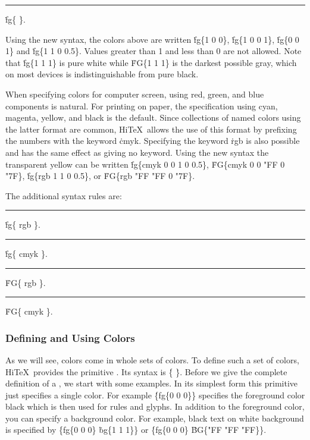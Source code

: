 \medskip
{}
\rule{}:
\.{fg\{}     \.{\}}.
\medskip

Using the new syntax, the colors above are written
\.{fg\{1 0 0\}}, \.{fg\{1 0 0 1\}},
\.{fg\{0 0 1\}} and \.{fg\{1 1 0 0.5\}}.
Values greater than 1 and less than 0 are not allowed.
Note that \.{fg\{1 1 1\}} is pure white while  \.{FG\{1 1 1\}} is
the darkest possible gray, which on most devices is indistinguishable
from pure black.

When specifying colors for computer screen, using red, green, and blue
components is natural. For printing on paper, the specification using
cyan, magenta, yellow, and black is the default.
Since collections of named colors using the latter format
are common, Hi\TeX\ allows the use of this format by prefixing the numbers with
the keyword \.{cmyk}. Specifying the keyword \.{rgb} is also possible and has the
same effect as giving no keyword. Using the new syntax the transparent yellow
can be written \.{fg\{cmyk 0 0 1 0 0.5\}},  \.{FG\{cmyk 0 0 "FF 0 "7F\}},
 \.{fg\{rgb 1 1 0 0.5\}}, or \.{FG\{rgb "FF "FF 0 "7F\}}.

The additional syntax rules are:

\medskip
{}
\rule{}:
\.{fg\{ rgb     \}}.
\rule{}:
\.{fg\{ cmyk      \}}.
\rule{}:
   \.{FG\{ rgb     \}}.
\rule{}:
   \.{FG\{ cmyk      \}}.
\medskip

\subsubsection{Defining and Using Colors}
As we will see, colors come in whole sets of colors.
To define such a set of colors, Hi\TeX\ provides
the primitive . Its syntax is
\medskip
\prim{} \.{\{}  \.{\}}.
\medskip
Before we give the complete definition of a  ,
we start with some examples.
In its simplest form this primitive just specifies a single color.
For example \.{\{fg\{0 0 0\}\}} specifies
the foreground color black which is then used for rules and glyphs.
In addition to the foreground color, you can specify a background color.
For example, black text on white background is specified by
\.{\{fg\{0 0 0\}} \.{bg\{1 1 1\}\}} or
\.{\{fg\{0 0 0\}} \.{BG\{"FF "FF "FF\}\}}.

